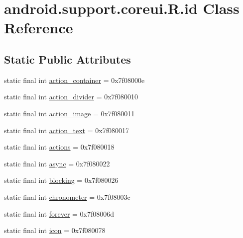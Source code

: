 \hypertarget{classandroid_1_1support_1_1coreui_1_1R_1_1id}{}\section{android.\+support.\+coreui.\+R.\+id Class Reference}
\label{classandroid_1_1support_1_1coreui_1_1R_1_1id}
\subsection*{Static Public Attributes}
\begin{DoxyCompactItemize}
\item 
static final int \mbox{\hyperlink{classandroid_1_1support_1_1coreui_1_1R_1_1id_ab08f73dec2ffe5900d7e26308a41ca1a}{action\+\_\+container}} = 0x7f08000e
\item 
static final int \mbox{\hyperlink{classandroid_1_1support_1_1coreui_1_1R_1_1id_aadbd486f98091a3758271424dee39faf}{action\+\_\+divider}} = 0x7f080010
\item 
static final int \mbox{\hyperlink{classandroid_1_1support_1_1coreui_1_1R_1_1id_ab9210a0246b32bd9b958a161e42647f4}{action\+\_\+image}} = 0x7f080011
\item 
static final int \mbox{\hyperlink{classandroid_1_1support_1_1coreui_1_1R_1_1id_a04ddcfd3534baf08dd481c9f6b309156}{action\+\_\+text}} = 0x7f080017
\item 
static final int \mbox{\hyperlink{classandroid_1_1support_1_1coreui_1_1R_1_1id_a2f8a984090fad6cdcf746163f68590ce}{actions}} = 0x7f080018
\item 
static final int \mbox{\hyperlink{classandroid_1_1support_1_1coreui_1_1R_1_1id_a6d2b515de1846dbedb9dbf58bbbb618f}{async}} = 0x7f080022
\item 
static final int \mbox{\hyperlink{classandroid_1_1support_1_1coreui_1_1R_1_1id_a448f92c365418e0e65bde41ec6ba7727}{blocking}} = 0x7f080026
\item 
static final int \mbox{\hyperlink{classandroid_1_1support_1_1coreui_1_1R_1_1id_a5fe7d48ab6417172fb6efe0bb56d660c}{chronometer}} = 0x7f08003c
\item 
static final int \mbox{\hyperlink{classandroid_1_1support_1_1coreui_1_1R_1_1id_a36dcc6cf4dd0fe587ac280966c92b655}{forever}} = 0x7f08006d
\item 
static final int \mbox{\hyperlink{classandroid_1_1support_1_1coreui_1_1R_1_1id_a98b9aa8151b1cf84e12e8e04f1bde7e5}{icon}} = 0x7f080078
\item 

\end{DoxyCompactItemize}
